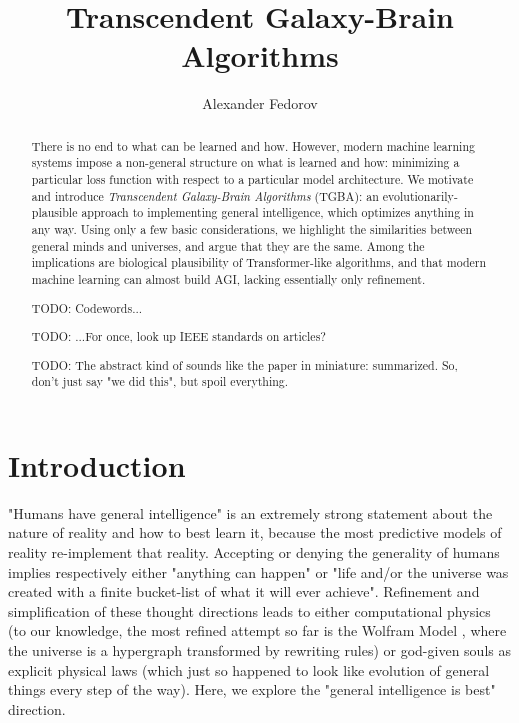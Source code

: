 \documentclass{article}
\begin{document}
\title{Transcendent Galaxy-Brain Algorithms}
\author{Alexander Fedorov}

\maketitle

\begin{abstract}

There is no end to what can be learned and how. However, modern machine learning systems impose a non-general structure on what is learned and how: minimizing a particular loss function with respect to a particular model architecture. We motivate and introduce \textit{Transcendent Galaxy-Brain Algorithms} (TGBA): an evolutionarily-plausible approach to implementing general intelligence, which optimizes anything in any way. Using only a few basic considerations, we highlight the similarities between general minds and universes, and argue that they are the same. Among the implications are biological plausibility of Transformer-like algorithms, and that modern machine learning can almost build AGI, lacking essentially only refinement.

    TODO: Codewords...

    TODO: ...For once, look up IEEE standards on articles?

    TODO: The abstract kind of sounds like the paper in miniature: summarized. So, don't just say "we did this", but spoil everything.

\end{abstract}

\section{Introduction}

"Humans have general intelligence" is an extremely strong statement about the nature of reality and how to best learn it, because the most predictive models of reality re-implement that reality. Accepting or denying the generality of humans implies respectively either "anything can happen" or "life and/or the universe was created with a finite bucket-list of what it will ever achieve". Refinement and simplification of these thought directions leads to either computational physics (to our knowledge, the most refined attempt so far is the Wolfram Model \cite{Wolfram_2020}, where the universe is a hypergraph transformed by rewriting rules) or god-given souls as explicit physical laws (which just so happened to look like evolution of general things every step of the way). Here, we explore the "general intelligence is best" direction.
\end{document}

